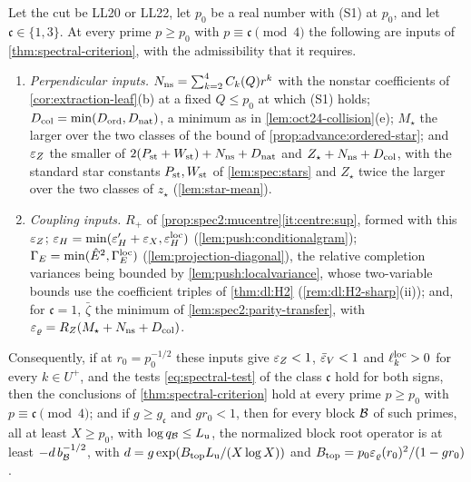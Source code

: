 \begin{lemma}\label{lem:upper-completed-root}
Let the cut be LL20 or LL22, let $p_0$ be a real number with (S1) at $p_0$, and let
$\mathfrak c\in\{1,3\}$. At every prime $p\ge p_0$ with $p\equiv\mathfrak c\pmod4$ the
following are inputs of \cref{thm:spectral-criterion}, with the admissibility that
it requires.
\begin{enumerate}[label=(\roman*)]
\item \emph{Perpendicular inputs.} $N_{\rm ns}=\sum_{k=2}^4C_k(Q)r^k$ with the
 nonstar coefficients of \cref{cor:extraction-leaf}(b) at a fixed $Q\le p_0$ at which
 (S1) holds;
 $D_{\rm col}=\min(D_{\rm ord},D_{\rm nat})$, a minimum as in
 \cref{lem:oct24-collision}(e); $M_\star$ the larger over the two classes of the bound of
 \cref{prop:advance:ordered-star}; and $\varepsilon_Z$ the smaller of
 $2(P_{\rm st}+W_{\rm st})+N_{\rm ns}+D_{\rm nat}$ and $Z_\star+N_{\rm ns}+D_{\rm col}$,
 with the standard star constants $P_{\rm st},W_{\rm st}$ of \cref{lem:spec:stars}
 and $Z_\star$ twice the larger over the two classes of $z_\star$
 (\cref{lem:star-mean}).
\item \emph{Coupling inputs.} $R_+$ of \cref{prop:spec2:mucentre}\ref{it:centre:sup},
 formed with this $\varepsilon_Z$; $\varepsilon_H=\min(\varepsilon'_H+\varepsilon_X,\varepsilon^{\rm loc}_H)$
 (\cref{lem:push:conditionalgram}); $\Gamma_E=\min(\hat E^2,\Gamma^{\rm loc}_E)$
 (\cref{lem:projection-diagonal}), the relative completion variances being bounded
 by \cref{lem:push:localvariance}, whose two-variable bounds use the coefficient
 triples of \cref{thm:dl:H2} (\cref{rem:dl:H2-sharp}(ii)); and, for $\mathfrak c=1$,
 $\bar\zeta$ the minimum of \cref{lem:spec2:parity-transfer}, with
 $\varepsilon_\varrho=R_Z(M_\star+N_{\rm ns}+D_{\rm col})$.
\end{enumerate}
Consequently, if at $r_0=p_0^{-1/2}$ these inputs give $\varepsilon_Z<1$, $\bar{\varepsilon}_V<1$
and $\ell^{\rm loc}_k>0$ for every $k\in U^+$, and the tests
\eqref{eq:spectral-test} of the class $\mathfrak c$ hold for both signs, then the
conclusions of \cref{thm:spectral-criterion} hold at every prime $p\ge p_0$ with
$p\equiv\mathfrak c\pmod4$; and if $g\ge g_{\mathfrak c}$ and $gr_0<1$, then for every
block $\mathcal B$ of such primes, all at least $X\ge p_0$, with $\log q_\mathcal B\le L_{\rm u}$,
the normalized block root operator is at least $-d\,b_\mathcal B^{-1/2}$, with
$d=g\exp(B_{\rm top}L_{\rm u}/(X\log X))$ and $B_{\rm top}=p_0\varepsilon_\varrho(r_0)^2/(1-gr_0)$.
\end{lemma}

